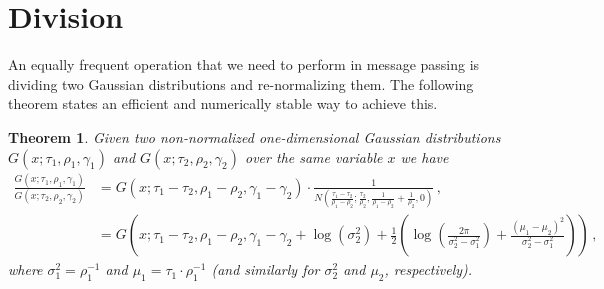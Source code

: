 \documentclass[a4paper]{article}
\newtheorem{thm}{Theorem}
\begin{document}
\section*{Division}
An equally frequent operation that we need to perform in message passing is dividing two Gaussian distributions and re-normalizing them. The following theorem states an efficient and numerically stable way to achieve this.
\begin{thm} \label{thm:division}
    Given two non-normalized one-dimensional Gaussian distributions $G(x;\tau_1,\rho_1,\gamma_1)$ and $G(x;\tau_2,\rho_2,\gamma_2)$ over the same variable $x$ we have
    \begin{align}
        \frac{G(x;\tau_1,\rho_1,\gamma_1)}{G(x;\tau_2,\rho_2,\gamma_2)} & = G(x;\tau_1 - \tau_2,\rho_1 - \rho_2,\gamma_1 - \gamma_2) \cdot \frac{1}{N\left(\frac{\tau_1-\tau_2}{\rho_1-\rho_2};\frac{\tau_2}{\rho_2},\frac{1}{\rho_1-\rho_2}+\frac{1}{\rho_2},0\right)} \,, \label{eq:gauss_div}                                                \\
                                                                        & = G\left(x;\tau_1 - \tau_2,\rho_1 - \rho_2,\gamma_1 - \gamma_2 + \log\left(\sigma_2^2\right)+\frac{1}{2}\left(\log\left(\frac{2\pi}{\sigma_2^2-\sigma_1^2}\right) + \frac{\left(\mu_1 - \mu_2\right)^2}{\sigma_2^2-\sigma_1^2}\right)\right) \,,\label{eq:gauss_div2}
    \end{align}
    where $\sigma_1^2=\rho_1^{-1}$ and $\mu_1 = \tau_1\cdot\rho_1^{-1}$ (and similarly for $\sigma_2^2$ and $\mu_2$, respectively).
\end{thm}
\end{document}
